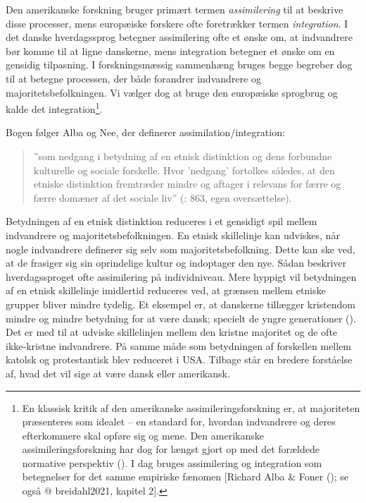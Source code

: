 \documentclass[
]{book}
\begin{document}
Den amerikanske forskning bruger primært termen \emph{assimilering} til at beskrive disse processer, mens europæiske forskere ofte foretrækker termen \emph{integration}. I det danske hverdagssprog betegner assimilering ofte et ønske om, at indvandrere bør komme til at ligne danskerne, mens integration betegner et ønske om en gensidig tilpasning. I forskningsmæssig sammenhæng bruges begge begreber dog til at betegne processen, der både forandrer indvandrere og majoritetsbefolkningen. Vi vælger dog at bruge den europæiske sprogbrug og kalde det integration\footnote{En klassisk kritik af den amerikanske assimileringsforskning er, at majoriteten præsenteres som idealet -- en standard for, hvordan indvandrere og deres efterkommere skal opføre sig og mene. Den amerikanske assimileringsforskning har dog for længst gjort op med det forældede normative perspektiv (). I dag bruges assimilering og integration som betegnelser for det samme empiriske fænomen {[}Richard Alba \& Foner (); se også @ breidahl2021, kapitel 2{]}.}.

Bogen følger Alba og Nee, der definerer assimilation/integration:

\begin{quote}
''som nedgang i betydning af en etnisk distinktion og dens forbundne kulturelle og sociale forskelle. Hvor 'nedgang' fortolkes således, at den etniske distinktion fremtræder mindre og aftager i relevans for færre og færre domæner af det sociale liv'' (: 863, egen oversættelse).
\end{quote}

Betydningen af en etnisk distinktion reduceres i et gensidigt spil mellem indvandrere og majoritetsbefolkningen. En etnisk skillelinje kan udviskes, når nogle indvandrere definerer sig selv som majoritetsbefolkning. Dette kan ske ved, at de frasiger sig sin oprindelige kultur og indoptager den nye. Sådan beskriver hverdagssproget ofte assimilering på individniveau. Mere hyppigt vil betydningen af en etnisk skillelinje imidlertid reduceres ved, at grænsen mellem etniske grupper bliver mindre tydelig. Et eksempel er, at danskerne tillægger kristendom mindre og mindre betydning for at være dansk; specielt de yngre generationer (). Det er med til at udviske skillelinjen mellem den kristne majoritet og de ofte ikke-kristne indvandrere. På samme måde som betydningen af forskellen mellem katolsk og protestantisk blev reduceret i USA. Tilbage står en bredere forståelse af, hvad det vil sige at være dansk eller amerikansk.
\end{document}
